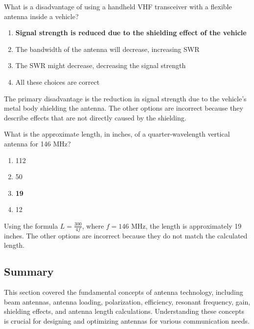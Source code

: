 
\begin{tcolorbox}[colback=gray!10!white,colframe=black!75!black,title={T9A07}]
    What is a disadvantage of using a handheld VHF transceiver with a flexible antenna inside a vehicle?
    \begin{enumerate}[label=\Alph*),noitemsep]
        \item \textbf{Signal strength is reduced due to the shielding effect of the vehicle}
        \item The bandwidth of the antenna will decrease, increasing SWR
        \item The SWR might decrease, decreasing the signal strength
        \item All these choices are correct
    \end{enumerate}
\end{tcolorbox}
The primary disadvantage is the reduction in signal strength due to the vehicle's metal body shielding the antenna. The other options are incorrect because they describe effects that are not directly caused by the shielding.


\begin{tcolorbox}[colback=gray!10!white,colframe=black!75!black,title={T9A08}]
    What is the approximate length, in inches, of a quarter-wavelength vertical antenna for 146 MHz?
    \begin{enumerate}[label=\Alph*),noitemsep]
        \item 112
        \item 50
        \item \textbf{19}
        \item 12
    \end{enumerate}
\end{tcolorbox}
Using the formula \( L = \frac{300}{4f} \), where \( f = 146 \) MHz, the length is approximately 19 inches. The other options are incorrect because they do not match the calculated length.


\subsection*{Summary}
This section covered the fundamental concepts of antenna technology, including beam antennas, antenna loading, polarization, efficiency, resonant frequency, gain, shielding effects, and antenna length calculations. Understanding these concepts is crucial for designing and optimizing antennas for various communication needs.

